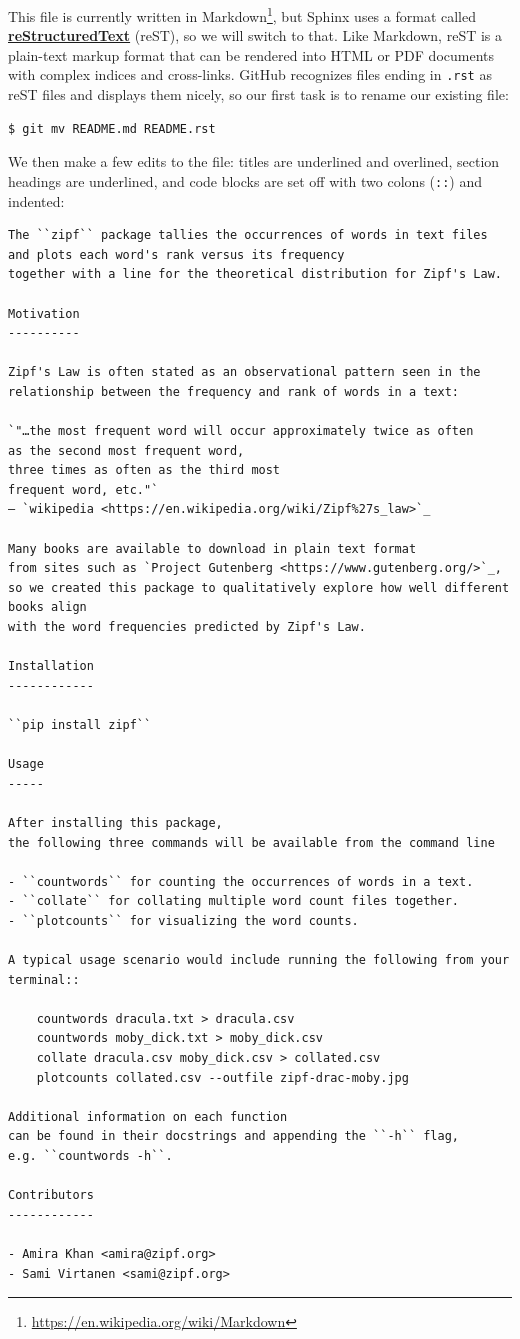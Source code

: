 \documentclass[
]{krantz}
\renewcommand{\href}[2]{#2\footnote{\url{#1}}}
\newcommand{\gref}[2]{\hyperlink{#2}{\textbf{#1}}}
\begin{document}
This file is currently written in \href{https://en.wikipedia.org/wiki/Markdown}{Markdown},
but Sphinx uses a format called \gref{reStructuredText}{restructured\_text} (reST),
so we will switch to that.
Like Markdown,
reST is a plain-text markup format
that can be rendered into HTML or PDF documents
with complex indices and cross-links.
GitHub recognizes files ending in \texttt{.rst} as reST files and displays them nicely,
so our first task is to rename our existing file:

\begin{verbatim}
$ git mv README.md README.rst
\end{verbatim}

We then make a few edits to the file:
titles are underlined and overlined,
section headings are underlined,
and code blocks are set off with two colons (\texttt{::}) and indented:

\begin{verbatim}
The ``zipf`` package tallies the occurrences of words in text files
and plots each word's rank versus its frequency
together with a line for the theoretical distribution for Zipf's Law.

Motivation
----------

Zipf's Law is often stated as an observational pattern seen in the
relationship between the frequency and rank of words in a text:

`"…the most frequent word will occur approximately twice as often
as the second most frequent word,
three times as often as the third most
frequent word, etc."`  
— `wikipedia <https://en.wikipedia.org/wiki/Zipf%27s_law>`_

Many books are available to download in plain text format
from sites such as `Project Gutenberg <https://www.gutenberg.org/>`_,
so we created this package to qualitatively explore how well different books align
with the word frequencies predicted by Zipf's Law.

Installation
------------

``pip install zipf``

Usage
-----

After installing this package,
the following three commands will be available from the command line

- ``countwords`` for counting the occurrences of words in a text.
- ``collate`` for collating multiple word count files together.
- ``plotcounts`` for visualizing the word counts.

A typical usage scenario would include running the following from your terminal::

    countwords dracula.txt > dracula.csv
    countwords moby_dick.txt > moby_dick.csv
    collate dracula.csv moby_dick.csv > collated.csv
    plotcounts collated.csv --outfile zipf-drac-moby.jpg

Additional information on each function
can be found in their docstrings and appending the ``-h`` flag,
e.g. ``countwords -h``.

Contributors
------------

- Amira Khan <amira@zipf.org>
- Sami Virtanen <sami@zipf.org>
\end{verbatim}
\end{document}
